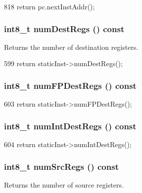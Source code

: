 \begin{DoxyCode}
818 { return pc.nextInstAddr(); }
\end{DoxyCode}
\hypertarget{classBaseDynInst_ab7e23352b3d45a982dfeb799030f87d0}{
\subsubsection[{numDestRegs}]{\setlength{\rightskip}{0pt plus 5cm}int8\_\-t numDestRegs () const}}
\label{classBaseDynInst_ab7e23352b3d45a982dfeb799030f87d0}
Returns the number of destination registers. 


\begin{DoxyCode}
599 { return staticInst->numDestRegs(); }
\end{DoxyCode}
\hypertarget{classBaseDynInst_a7ec0ad00d322ae83bc5fae443ef04323}{
\subsubsection[{numFPDestRegs}]{\setlength{\rightskip}{0pt plus 5cm}int8\_\-t numFPDestRegs () const}}
\label{classBaseDynInst_a7ec0ad00d322ae83bc5fae443ef04323}



\begin{DoxyCode}
603 { return staticInst->numFPDestRegs(); }
\end{DoxyCode}
\hypertarget{classBaseDynInst_a3935410f8201e0afd0f8e459f838b463}{
\subsubsection[{numIntDestRegs}]{\setlength{\rightskip}{0pt plus 5cm}int8\_\-t numIntDestRegs () const}}
\label{classBaseDynInst_a3935410f8201e0afd0f8e459f838b463}



\begin{DoxyCode}
604 { return staticInst->numIntDestRegs(); }
\end{DoxyCode}
\hypertarget{classBaseDynInst_a3902ecc708a6f28e94ee9aa975692915}{
\subsubsection[{numSrcRegs}]{\setlength{\rightskip}{0pt plus 5cm}int8\_\-t numSrcRegs () const}}
\label{classBaseDynInst_a3902ecc708a6f28e94ee9aa975692915}
Returns the number of source registers. 


